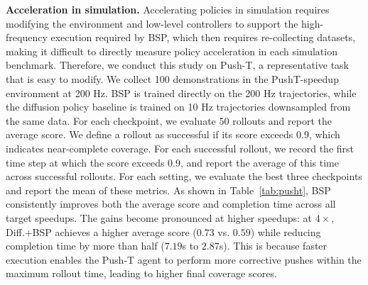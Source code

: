 \noindent\textbf{Acceleration in simulation.} Accelerating policies in simulation requires modifying the environment and low-level controllers to support the high-frequency execution required by BSP, which then requires re-collecting datasets, making it difficult to directly measure policy acceleration in each simulation benchmark. Therefore, we conduct this study on Push-T, a representative task that is easy to modify.
%
We collect 100 demonstrations in the PushT-speedup environment at 200 Hz. BSP is trained directly on the 200 Hz trajectories, while the diffusion policy baseline is trained on 10 Hz trajectories downsampled from the same data.
%
For each checkpoint, we evaluate 50 rollouts and report the average score. We define a rollout as successful if its score exceeds 0.9, which indicates near-complete coverage. For each successful rollout, we record the first time step at which the score exceeds 0.9, and report the average of this time across successful rollouts. For each setting, we evaluate the best three checkpoints and report the mean of these metrics.\newline 
%
As shown in Table~\ref{tab:pusht}, BSP consistently improves both the average score and completion time across all target speedups. The gains become pronounced at higher speedups: at $4\times$, Diff.+BSP achieves a higher average score ($0.73$ vs. $0.59$) while reducing completion time by more than half ($7.19$s to $2.87$s). This is because faster execution enables the Push-T agent to perform more corrective pushes within the maximum rollout time, leading to higher final coverage scores. 
%




